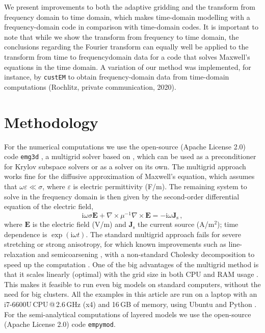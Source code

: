 \documentclass[extra, camera,%
    final,       %
]{gji}
\newcommand{\emg}[2]{\texttt{emg#1#2}\xspace}
\newcommand{\empymod}{\texttt{empymod}\xspace}
\newcommand{\custem}{\texttt{custEM}\xspace}
\begin{document}
We present improvements to both the adaptive gridding and the transform from
frequency domain to time domain, which makes time-domain modelling with a
frequency-domain code  in comparison
with time-domain codes. It is important to note that while we show the
transform from frequency to time domain, the conclusions regarding the Fourier
transform can equally well be applied to the transform from time
to frequency\replaced{-}{ }domain data for a code that solves Maxwell's
equations in the time domain. A variation of our method was implemented, for
instance, by \custem \citep{GEO.19.Rochlitz} to obtain frequency-domain data
from time-domain computations (Rochlitz, private communication, 2020).


\section{Methodology} %

For the numerical computations we use the open-source (Apache License 2.0) code
\emg3d \citep{JOSS.19.Werthmuller}, a multigrid solver based on
\cite{GP.06.Mulder}, which can be used as a preconditioner for Krylov subspace
solvers or as a solver on its own. The multigrid approach works fine for the
diffusive approximation of Maxwell's equation, which assumes that
$\omega\varepsilon \ll \sigma$, where $\varepsilon$ is electric permittivity
(F/m). The remaining system to solve in the frequency domain is then given by
the second-order differential equation of the electric field,
%
\begin{equation}
    \mathrm{i}\omega\sigma \mathbf{E} +
    \nabla \times \mu^{-1} \nabla \times \mathbf{E}
    = -\mathrm{i}\omega\mathbf{J}_\mathrm{s} \, ,
  \label{eq:maxwell}
\end{equation}
%
where $\mathbf{E}$ is the electric field (V/m) and $\mathbf{J}_\mathrm{s}$ the
current source (A/m$^2$); time dependence is $\exp(\mathrm{i}\omega t)$. The
standard multigrid approach fails for severe stretching or strong anisotropy,
for which \deleted{\emg3d has implemented }known improvements such as
line-relaxation and semicoarsening \citep{ECCFD.06.Jonsthovel} , with a non-standard Cholesky decomposition to speed up the
computation \citep{GEO.08.Mulder}. One of the big advantages of the multigrid
method is that it scales linearly (optimal) with the grid size in both CPU and
RAM usage \citep{B.Springer.20.Mulder}. This makes it feasible to run even big
models on standard computers, without the need for big clusters. All the
examples in this article are run on a laptop with an i7-6600U\,CPU\,@\,2.6\,GHz
(x4) and 16\,GB of memory, using Ubuntu  and Python
.  For the semi-analytical computations of layered models we use the
open-source (Apache License 2.0) code \empymod \citep{GEO.17.Werthmuller}.
\end{document}
